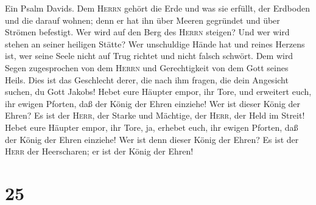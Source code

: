  Ein Psalm Davids. Dem \textsc{Herrn} gehört die Erde und
was sie erfüllt, der Erdboden und die darauf wohnen;  denn
er hat ihn über Meeren gegründet und über Strömen befestigt.
 Wer wird auf den Berg des \textsc{Herrn} steigen? Und wer
wird stehen an seiner heiligen Stätte?  Wer unschuldige
Hände hat und reines Herzens ist, wer seine Seele nicht auf Trug richtet
und nicht falsch schwört.  Dem wird Segen zugesprochen von
dem \textsc{Herrn} und Gerechtigkeit von dem Gott seines Heils.
 Dies ist das Geschlecht derer, die nach ihm fragen, die
dein Angesicht suchen, du Gott Jakobs!  Hebet eure Häupter
empor, ihr Tore, und erweitert euch, ihr ewigen Pforten, daß der König
der Ehren einziehe!  Wer ist dieser König der Ehren? Es
ist der \textsc{Herr}, der Starke und Mächtige, der \textsc{Herr}, der
Held im Streit!  Hebet eure Häupter empor, ihr Tore, ja,
erhebet euch, ihr ewigen Pforten, daß der König der Ehren einziehe!
 Wer ist denn dieser König der Ehren? Es ist der
\textsc{Herr} der Heerscharen; er ist der König der Ehren!

\hypertarget{section-24}{%
\section{25}\label{section-24}}

